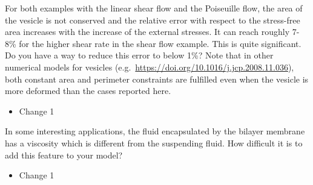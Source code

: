 \documentclass[11pt]{article}
\newcommand{\comment}[1]{{\color{blue} #1}}
\begin{document}
\noindent
\comment{For both examples with the linear shear flow and the Poiseuille
flow, the area of the vesicle is not conserved and the relative error
with respect to the stress-free area increases with the increase of the
external stresses. It can reach roughly 7-8\% for the higher shear rate
in the shear flow example. This is quite significant. Do you have a way
to reduce this error to below 1\%? Note that in other numerical models
for vesicles (e.g.~\url{https://doi.org/10.1016/j.jcp.2008.11.036}),
both constant area and perimeter constraints are fulfilled even when the
vesicle is more deformed than the cases reported here.}
\begin{itemize}
  \item Change 1 
\end{itemize}

\noindent
\comment{In some interesting applications, the fluid encapsulated by the
bilayer membrane has a viscosity which is different from the suspending
fluid. How difficult it is to add this feature to your model?}
\begin{itemize}
  \item Change 1 
\end{itemize}
\end{document}
